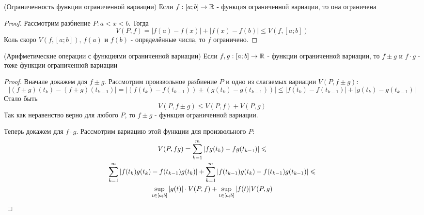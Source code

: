 
\begin{theorem} (Ограниченность функции ограниченной вариации)
	Если $f: [a; b] \to \mathbb{R}$ - функция ограниченной вариации, то она ограничена
\end{theorem}

\begin{proof}
	Рассмотрим разбиение $P: a < x < b$. Тогда
	\[
		V(P, f) = |f(a) - f(x)| + |f(x) - f(b)| \le V(f, [a; b])
	\]
	Коль скоро $V(f, [a; b])$, $f(a)$ и $f(b)$ - определённые числа, то $f$ ограничено.
\end{proof}

\begin{theorem} (Арифметические операции с функциями ограниченной вариации)
	Если $f, g: [a; b] \to \mathbb{R}$ - функции ограниченной вариации, то $f \pm g$ и $f \cdot g$ - тоже функции ограниченной вариации
\end{theorem}

\begin{proof}
	Вначале докажем для $f \pm g$. Рассмотрим произвольное разбиение $P$ и одно из слагаемых вариации $V(P, f \pm g)$:
	\[
		|(f \pm g)(t_k) - (f \pm g)(t_{k - 1})| = |(f(t_k) - f(t_{k - 1})) \pm (g(t_k) - g(t_{k - 1}))| \le |f(t_k) - f(t_{k - 1})| + |g(t_k) - g(t_{k - 1})|
	\]
	Стало быть
	\[
		V(P, f \pm g) \le V(P, f) + V(P, g)
	\]
	Так как неравенство верно для любого $P$, то $f \pm g$ - функция ограниченной вариации.
	
	Теперь докажем для $f \cdot g$. Рассмотрим вариацию этой функции для произвольного $P$:
	\begin{multline*}
		V(P, fg) = \sum\limits_{k = 1}^m |fg(t_k) - fg(t_{k - 1})| \leqslant
		\\
		\sum\limits_{k = 1}^m |f(t_k)g(t_k) - f(t_{k - 1})g(t_k)| + \sum\limits_{k = 1}^m |f(t_{k - 1})g(t_k) - f(t_{k - 1})g(t_{k - 1})| \leqslant
		\\
		\sup\limits_{t \in [a; b]} |g(t)| \cdot V(P, f) + \sup\limits_{t \in [a; b]} |f(t)| V(P, g)
	\end{multline*}
\end{proof}